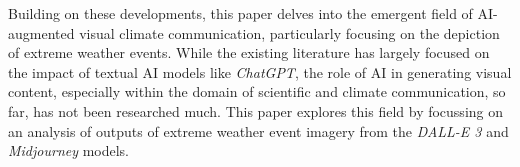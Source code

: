 Building on these developments, this paper delves into the emergent field of AI-augmented visual climate communication, particularly focusing on the depiction of extreme weather events. While the existing literature has largely focused on the impact of textual AI models like \textit{ChatGPT}, the role of AI in generating visual content, especially within the domain of scientific and climate communication, so far, has not been researched much. This paper explores this field by focussing on an analysis of outputs of extreme weather event imagery  from the \textit{DALL-E 3} and \textit{Midjourney} models.
